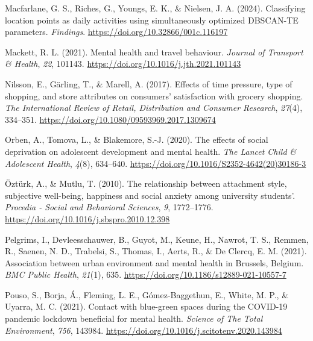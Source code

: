 \documentclass[
  letterpaper,
  number,
  review,
  3p]{elsarticle}
\newlength{\cslhangindent}
\newenvironment{CSLReferences}[2] %
 {\begin{list}{}{%
  \setlength{\itemindent}{0pt}
  \setlength{\leftmargin}{0pt}
  \setlength{\parsep}{0pt}
  \ifodd #1
   \setlength{\leftmargin}{\cslhangindent}
   \setlength{\itemindent}{-1\cslhangindent}
  \fi
  \setlength{\itemsep}{#2\baselineskip}}}
 {\end{list}}
\begin{document}
\begin{CSLReferences}{1}{0}
Macfarlane, G. S., Riches, G., Youngs, E. K., \& Nielsen, J. A. (2024).
Classifying location points as daily activities using simultaneously
optimized {DBSCAN-TE} parameters. \emph{Findings}.
\url{https://doi.org/10.32866/001c.116197}

Mackett, R. L. (2021). Mental health and travel behaviour. \emph{Journal
of Transport \& Health}, \emph{22}, 101143.
\url{https://doi.org/10.1016/j.jth.2021.101143}

Nilsson, E., Gärling, T., \& Marell, A. (2017). Effects of time
pressure, type of shopping, and store attributes on consumers'
satisfaction with grocery shopping. \emph{The International Review of
Retail, Distribution and Consumer Research}, \emph{27}(4), 334--351.
\url{https://doi.org/10.1080/09593969.2017.1309674}

Orben, A., Tomova, L., \& Blakemore, S.-J. (2020). The effects of social
deprivation on adolescent development and mental health. \emph{The
Lancet Child \& Adolescent Health}, \emph{4}(8), 634--640.
\url{https://doi.org/10.1016/S2352-4642(20)30186-3}

Öztürk, A., \& Mutlu, T. (2010). The relationship between attachment
style, subjective well-being, happiness and social anxiety among
university students'. \emph{Procedia - Social and Behavioral Sciences},
\emph{9}, 1772--1776. \url{https://doi.org/10.1016/j.sbspro.2010.12.398}

Pelgrims, I., Devleesschauwer, B., Guyot, M., Keune, H., Nawrot, T. S.,
Remmen, R., Saenen, N. D., Trabelsi, S., Thomas, I., Aerts, R., \& De
Clercq, E. M. (2021). Association between urban environment and mental
health in {Brussels}, {Belgium}. \emph{BMC Public Health}, \emph{21}(1),
635. \url{https://doi.org/10.1186/s12889-021-10557-7}

Pouso, S., Borja, Á., Fleming, L. E., Gómez-Baggethun, E., White, M. P.,
\& Uyarra, M. C. (2021). Contact with blue-green spaces during the
{COVID-19} pandemic lockdown beneficial for mental health. \emph{Science
of The Total Environment}, \emph{756}, 143984.
\url{https://doi.org/10.1016/j.scitotenv.2020.143984}


\end{CSLReferences}
\end{document}

